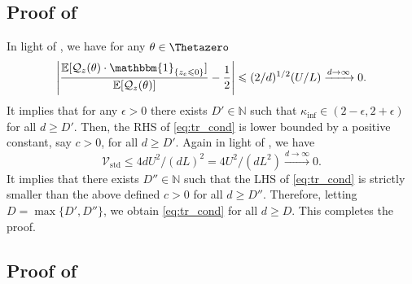 \documentclass[journal]{IEEEtran}
\providecommand{\N}{\mathbb{N}} %
\providecommand{\E}{\mathbb{E}} %
\providecommand{\ind}[1]{\ensuremath{\mathbbm{1}_{\left\{#1\right\}}}} %
\renewcommand{\geq}{\geqslant} %
\renewcommand{\leq}{\leqslant} %
\DeclarePairedDelimiter{\abs}{\lvert}{\rvert}
\theoremstyle{definition}
\begin{document}
\subsection{Proof of }\label{apdx:cor:tr_cond}
In light of , we have for any $\theta \in \Thetazero$
\begin{equation}
\abs*{
\frac{\E[\mathcal{Q}_z(\theta)\cdot\ind{z_e\leq 0}]}{\E[\mathcal{Q}_z(\theta)]} - \frac{1}{2}
}
\leq (2 / d)^{1/2} (U/L) \xrightarrow{d \to \infty} 0 .
\end{equation}
It implies that for any $\epsilon > 0$ there exists $D' \in \N$ such that $\kappa_{\inf} \in (2 - \epsilon, 2+\epsilon)$ for all $d \geq D'$. 
Then, the RHS of \eqref{eq:tr_cond} is lower bounded by a positive constant, say $c > 0$, for all $d \geq D'$. 
Again in light of , we have
\begin{equation}
    \mathcal{V}_\mathrm{std}
    \leq 4 d U^2/ (d L)^2 = 4 U^2/ (d L^2 ) \xrightarrow{d \to \infty} 0.
\end{equation}
It implies that there exists $D'' \in \N$ such that the LHS of \eqref{eq:tr_cond} is strictly smaller than the above defined $c > 0$ for all $d \geq D''$. 
Therefore, letting $D = \max\{D', D''\}$, we obtain \eqref{eq:tr_cond} for all $d \geq D$. This completes the proof.

\subsection{Proof of }\label{apdx:lemma:qualitygain}
\end{document}
